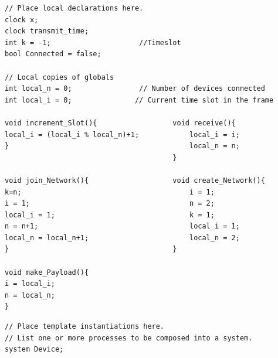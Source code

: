 \begin{lstlisting}[language={[GUI]Uppaal}, % use GUI flavor
columns={[l]flexible},
frameround=fftt, frame=shadowbox, rulesepcolor=\color{gray},
caption={Code for the local declarations for Device.}]
// Place local declarations here.
clock x;
clock transmit_time;
int k = -1;                     //Timeslot
bool Connected = false;

// Local copies of globals
int local_n = 0;                // Number of devices connected
int local_i = 0;               // Current time slot in the frame

void increment_Slot(){					void receive(){
local_i = (local_i % local_n)+1;		  	local_i = i;
}										  	local_n = n;
										}

void join_Network(){					void create_Network(){
k=n;									  	i = 1;
i = 1;										n = 2;
local_i = 1;								k = 1;
n = n+1;									local_i = 1;
local_n = local_n+1;						local_n = 2;
}										}

void make_Payload(){
i = local_i;
n = local_n;
}
\end{lstlisting}

\begin{lstlisting}[language={[GUI]Uppaal}, % use GUI flavor
columns={[l]flexible},
frameround=fftt, frame=shadowbox, rulesepcolor=\color{gray},
caption={Code for system declarations.}]
// Place template instantiations here.
// List one or more processes to be composed into a system.
system Device;
\end{lstlisting}